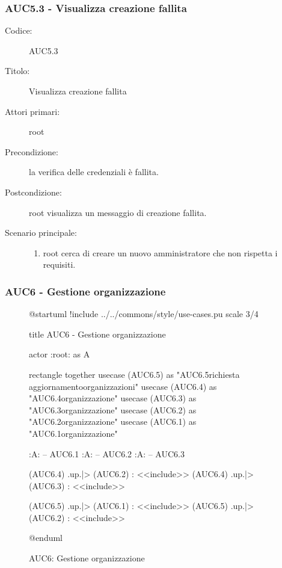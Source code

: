 \documentclass[casi-duso]{subfiles}
\begin{document}
\subsubsection{AUC5.3 - Visualizza creazione fallita}%
\label{subsub:AUC5.3}
\begin{description}
  \item[Codice:] AUC5.3
  \item[Titolo:] Visualizza creazione fallita
  \item[Attori primari:] root
  \item[Precondizione:] la verifica delle credenziali è fallita.
  \item[Postcondizione:] root visualizza un messaggio di creazione fallita.
  \item[Scenario principale:]
  \begin{enumerate}
    \item root cerca di creare un nuovo amministratore che non rispetta i requisiti.
  \end{enumerate}
\end{description}

\subsubsection{AUC6 - Gestione organizzazione}%
\label{subsub:AUC6}

\begin{figure}[h!] 
  \centering 
  \begin{plantuml}
  @startuml 
  !include ../../commons/style/use-cases.pu
  scale 3/4

  title AUC6 - Gestione organizzazione

  actor :root: as A

  rectangle {
    together {
      usecase (AUC6.5) as "AUC6.5\nInvio richiesta aggiornamento\nlista organizzazioni"
      usecase (AUC6.4) as "AUC6.4\nSeleziona organizzazione"
      usecase (AUC6.3) as "AUC6.3\nModifica organizzazione"
      usecase (AUC6.2) as "AUC6.2\nEliminazione organizzazione"
      usecase (AUC6.1) as "AUC6.1\nCreazione organizzazione"
    }
  }

  :A: -- AUC6.1
  :A: -- AUC6.2
  :A: -- AUC6.3

  (AUC6.4) .up.|> (AUC6.2) : <<include>>
  (AUC6.4) .up.|> (AUC6.3) : <<include>>

  (AUC6.5) .up.|> (AUC6.1) : <<include>>
  (AUC6.5) .up.|> (AUC6.2) : <<include>>

  @enduml
  \end{plantuml} 
  \caption{AUC6: Gestione organizzazione} 
  \label{fig:auc6} 
\end{figure}
\end{document}

